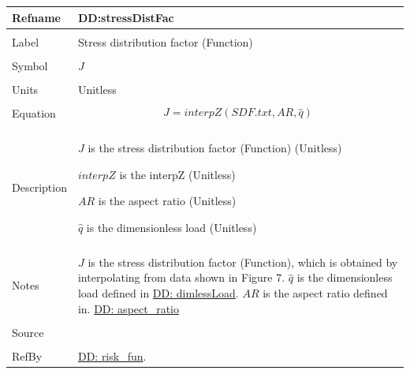 \documentclass[12pt]{article}
\begin{document}
\noindent \begin{minipage}{\textwidth}
\begin{tabular}{p{} p{}}
\toprule \textbf{Refname} & \textbf{DD:stressDistFac}
\label{DD:stressDistFac}
\\ \midrule \\
Label & Stress distribution factor (Function)
        \\ \midrule \\
        Symbol & $J$
                 \\ \midrule \\
                 Units & Unitless
                         \\ \midrule \\
                         Equation & \begin{displaymath}
                                    J=interpZ\left(SDF.txt,AR,\hat{q}\right)
                                    \end{displaymath}
                                    \\ \midrule \\
                                    Description & \begin{symbDescription}
                                                  \item{$J$ is the stress distribution factor (Function) (Unitless)}
                                                  \item{$interpZ$ is the interpZ (Unitless)}
                                                  \item{$AR$ is the aspect ratio (Unitless)}
                                                  \item{$\hat{q}$ is the dimensionless load (Unitless)}
                                                  \end{symbDescription}
                                                  \\ \midrule \\
                                                  Notes & $J$ is the stress distribution factor (Function), which is obtained by interpolating from data shown in Figure 7.
                                                          $\hat{q}$ is the dimensionless load defined in \hyperref[DD:dimlessLoad]{DD: dimlessLoad}.
                                                          $AR$ is the aspect ratio defined in. \hyperref[DD:aspect.ratio]{DD: aspect\_ratio}
                                                          \\ \midrule \\
                                                          Source & \cite{astm2009}
                                                                   \\ \midrule \\
                                                                   RefBy & \hyperref[DD:risk.fun]{DD: risk\_fun}.
\\ \bottomrule \end{tabular}
\end{minipage}
\par~
\end{document}
